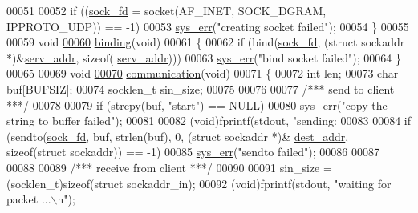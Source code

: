\begin{DoxyCode}
00051         
00052         \textcolor{keywordflow}{if} ((\hyperlink{udp_8h_a514331e6141a28289f8ddead55eadebd}{sock\_fd} = socket(AF\_INET, SOCK\_DGRAM, IPPROTO\_UDP)) == -1)
00053                 \hyperlink{error_8c_acf9a2facd46adb3083d36dbb8ea97521}{sys\_err}(\textcolor{stringliteral}{"creating socket failed"});
00054 \}
00055 
00059 \textcolor{keywordtype}{void}
\hypertarget{udp_8c_source_l00060}{}\hyperlink{udp_8h_a165726b24e152a113fdde7732b667b5f}{00060} \hyperlink{udp_8c_a165726b24e152a113fdde7732b667b5f}{binding}(\textcolor{keywordtype}{void})
00061 \{
00062         \textcolor{keywordflow}{if} (bind(\hyperlink{udp_8h_a514331e6141a28289f8ddead55eadebd}{sock\_fd}, (\textcolor{keyword}{struct} sockaddr *)&\hyperlink{udp_8h_ac724fe70ae8af2d1406927ee7b574a1b}{serv\_addr}, \textcolor{keyword}{sizeof}(
      \hyperlink{udp_8h_ac724fe70ae8af2d1406927ee7b574a1b}{serv\_addr})))
00063                 \hyperlink{error_8c_acf9a2facd46adb3083d36dbb8ea97521}{sys\_err}(\textcolor{stringliteral}{"bind socket failed"});
00064 \}
00065 
00069 \textcolor{keywordtype}{void}
\hypertarget{udp_8c_source_l00070}{}\hyperlink{udp_8h_a0b55dfe2fd6924e01624911af758ae03}{00070} \hyperlink{udp_8c_a0b55dfe2fd6924e01624911af758ae03}{communication}(\textcolor{keywordtype}{void})
00071 \{
00072         \textcolor{keywordtype}{int}             len;
00073         \textcolor{keywordtype}{char}            buf[BUFSIZ];
00074         socklen\_t       sin\_size;
00075         
00076 
00077         \textcolor{comment}{/*** send to client ***/}
00078 
00079         \textcolor{keywordflow}{if} (strcpy(buf, \textcolor{stringliteral}{"start"}) == NULL)
00080                 \hyperlink{error_8c_acf9a2facd46adb3083d36dbb8ea97521}{sys\_err}(\textcolor{stringliteral}{"copy the string to buffer failed"});
00081         
00082         (void)fprintf(stdout, \textcolor{stringliteral}{"sending: %
00083 
00084         \textcolor{keywordflow}{if} (sendto(\hyperlink{udp_8h_a514331e6141a28289f8ddead55eadebd}{sock\_fd}, buf, strlen(buf), 0, (\textcolor{keyword}{struct} sockaddr *)&
      \hyperlink{udp_8h_a072220ecebc8a6044aca4afa78eefebd}{dest\_addr}, \textcolor{keyword}{sizeof}(\textcolor{keyword}{struct} sockaddr)) == -1)
00085                 \hyperlink{error_8c_acf9a2facd46adb3083d36dbb8ea97521}{sys\_err}(\textcolor{stringliteral}{"sendto failed"});
00086 
00087 
00088 
00089         \textcolor{comment}{/*** receive from client ***/}
00090 
00091         sin\_size = (socklen\_t)\textcolor{keyword}{sizeof}(\textcolor{keyword}{struct} sockaddr\_in);
00092         (void)fprintf(stdout, \textcolor{stringliteral}{"waiting for packet ...\(\backslash\)n"});
}
\end{DoxyCode}
